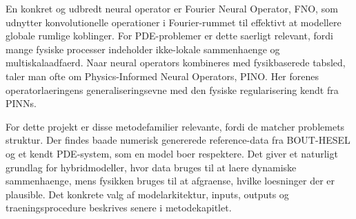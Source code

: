 En konkret og udbredt neural operator er Fourier Neural Operator, FNO, som udnytter konvolutionelle operationer i Fourier-rummet til effektivt at modellere globale rumlige koblinger. For PDE-problemer er dette saerligt relevant, fordi mange fysiske processer indeholder ikke-lokale sammenhaenge og multiskalaadfaerd. Naar neural operators kombineres med fysikbaserede tabsled, taler man ofte om Physics-Informed Neural Operators, PINO. Her forenes operatorlaeringens generaliseringsevne med den fysiske regularisering kendt fra PINNs.

For dette projekt er disse metodefamilier relevante, fordi de matcher problemets struktur. Der findes baade numerisk genererede reference-data fra BOUT-HESEL og et kendt PDE-system, som en model boer respektere. Det giver et naturligt grundlag for hybridmodeller, hvor data bruges til at laere dynamiske sammenhaenge, mens fysikken bruges til at afgraense, hvilke loesninger der er plausible. Det konkrete valg af modelarkitektur, inputs, outputs og traeningsprocedure beskrives senere i metodekapitlet.
